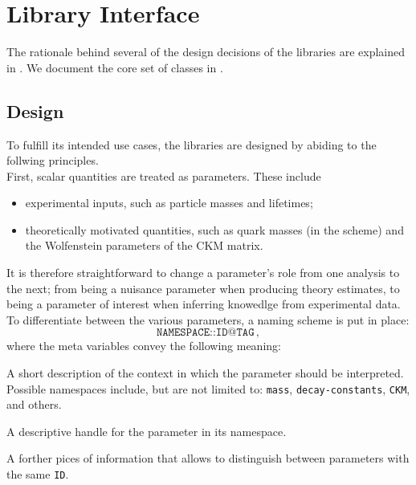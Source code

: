 
\chapter{Library Interface}
\label{ch:interface}

The rationale behind several of the design decisions of the \ctg libraries are
explained in . We document the core set of \cpp
classes in .


\section{Design}
\label{sec:interface:design}

To fulfill its intended use cases, the \ctg libraries are designed by abiding
to the follwing principles.\\

First, scalar quantities are treated as parameters.
These include
\begin{itemize}
    \item experimental inputs, such as particle masses and lifetimes;
    \item theoretically motivated quantities, such as quark masses
        (\eg in the \MSbar scheme) and the Wolfenstein parameters of the CKM matrix.
\end{itemize}
It is therefore straightforward to change a parameter's role from one analysis to the next;
\eg from being a nuisance parameter when producing theory estimates, to being a parameter
of interest when inferring knowedlge from experimental data. To differentiate between the
various parameters, a naming scheme is put in place:
\begin{equation}
    \texttt{NAMESPACE::ID@TAG}\,,
\end{equation}
where the meta variables convey the following meaning:
\begin{description}[leftmargin=!,labelwidth=.15\textwidth]
    \item[\texttt{NAMESPACE}]
            A short description of the context in which the parameter should be
            interpreted. Possible namespaces include, but are not limited to: \texttt{mass},
        \texttt{decay-constants}, \texttt{CKM}, and others. \\
    \item[\texttt{ID}]
            A descriptive handle for the parameter in its namespace.\\
    \item[\texttt{TAG}]
            A forther pices of information that allows to distinguish between
            parameters with the same \texttt{ID}.\\
\end{description}


